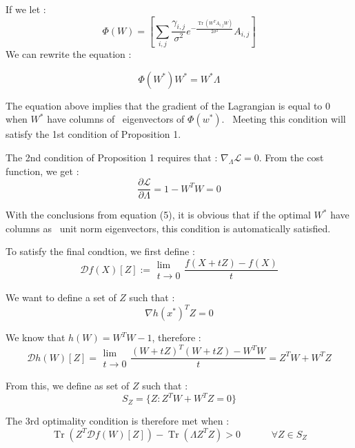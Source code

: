 \documentclass{article}
\newcommand{\assign}{:=}
\newcommand{\tmop}[1]{\ensuremath{\operatorname{#1}}}
\begin{document}
If we let :
\[ \Phi ( W) = \left[ \sum_{i, j} \frac{\gamma_{i, j}}{\sigma^2} e^{-
   \frac{\tmop{Tr} ( W^T A_{i, j} W)}{2 \sigma^2}} A_{i, j} \right] \]
We can rewrite the equation :


\begin{equation}
  \Phi ( W^{\ast}) W^{\ast} = W^{\ast} \Lambda
\end{equation}


The equation above implies that the gradient of the Lagrangian is equal to 0
when $W^{\ast}$ have columns of \ eigenvectors of $\Phi ( w^{\ast})$. \
Meeting this condition will satisfy the 1st condition of Proposition 1.



The 2nd condition of Proposition 1 requires that : $\nabla_{\Lambda}
\mathcal{L}= 0$. From the cost function, we get :
\begin{equation}
  \frac{\partial \mathcal{L}}{\partial \Lambda} = 1 - W^T W = 0
\end{equation}


With the conclusions from equation (5), it is obvious that if the optimal
$W^{\ast}$ have columns as \ unit norm eigenvectors, this condition is
automatically satisfied.



To satisfy the final condtion, we first define :
\[ \mathcal{D}f ( X) [ Z] \assign \begin{array}{l}
     \lim\\
     t \rightarrow 0
   \end{array} \frac{f ( X + t Z) - f ( X)}{t} \]


We want to define a set of $Z$ such that :
\[ \nabla h ( x^{\ast})^T Z = 0 \]


We know that $h ( W) = W^T W - 1$, therefore :
\[ \mathcal{D}h ( W) [ Z] = \begin{array}{l}
     \lim\\
     t \rightarrow 0
   \end{array} \frac{( W + t Z)^T ( W + t Z) - W^T W}{t} = Z^T W + W^T Z \]


From this, we define as set of $Z$ such that :
\[ S_Z = \{ Z : Z^T W + W^T Z = 0 \} \]


The 3rd optimality condition is therefore met when :
\[ \tmop{Tr} ( Z^T \mathcal{D}f ( W) [ Z]) - \tmop{Tr} ( \Lambda Z^T Z) > 0
   \begin{array}{llll}
     &  &  & 
   \end{array} \forall Z \in S_Z \]
\end{document}
